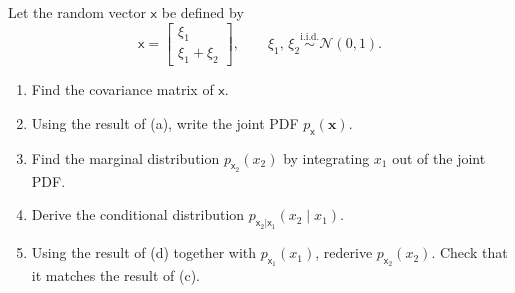 \begin{exercise} %
    Let the random vector $\boldsymbol{\mathsf{x}}$ be defined by
    \[
        \boldsymbol{\mathsf{x}}
        = \begin{bmatrix} \xi_{1} \\ \xi_{1} + \xi_{2} \end{bmatrix},
        \qquad
        \xi_{1},\, \xi_{2}
        \overset{\mathrm{i.i.d.}}{\sim} \mathcal{N}(0,1).
    \]
    \begin{enumerate}[label=(\alph*)]
        \item Find the covariance matrix of $\boldsymbol{\mathsf{x}}$.
        \item Using the result of (a), write the joint PDF
              $p_{\boldsymbol{\mathsf{x}}}(\mathbf{x})$.
        \item Find the marginal distribution $p_{\mathsf{x}_{2}}(x_{2})$
              by integrating $x_{1}$ out of the joint PDF.
        \item Derive the conditional distribution
              $p_{\mathsf{x}_{2}|\mathsf{x}_{1}}(x_{2} \mid x_{1})$.
        \item Using the result of (d) together with
              $p_{\mathsf{x}_{1}}(x_{1})$, rederive
              $p_{\mathsf{x}_{2}}(x_{2})$. Check that it matches the
              result of (c).
    \end{enumerate}
\end{exercise}

